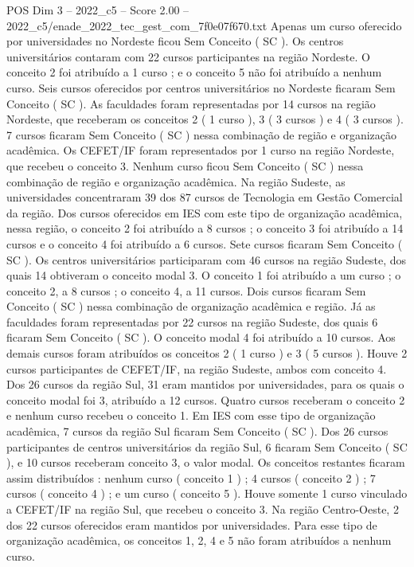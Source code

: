 \begin{textsample}{POS Dim 3 – 2022\_c5 – Score 2.00 – 2022\_c5/enade\_2022\_tec\_gest\_com\_7f0e07f670.txt}
Apenas um curso oferecido por universidades no Nordeste ficou Sem Conceito ( SC ).
Os centros universitários contaram com 22 cursos participantes na região Nordeste.
O conceito 2 foi atribuído a 1 curso ; e o conceito 5 não foi atribuído a nenhum curso.
Seis cursos oferecidos por centros universitários no Nordeste ficaram Sem Conceito ( SC ).
As faculdades foram representadas por 14 cursos na região Nordeste, que receberam os conceitos 2 ( 1 curso ), 3 ( 3 cursos ) e 4 ( 3 cursos ). 7 cursos ficaram Sem Conceito ( SC ) nessa combinação de região e organização acadêmica.
Os CEFET/IF foram representados por 1 curso na região Nordeste, que recebeu o conceito 3.
Nenhum curso ficou Sem Conceito ( SC ) nessa combinação de região e organização acadêmica.
Na região Sudeste, as universidades concentraram 39 dos 87 cursos de Tecnologia em Gestão Comercial da região.
Dos cursos oferecidos em IES com este tipo de organização acadêmica, nessa região, o conceito 2 foi atribuído a 8 cursos ; o conceito 3 foi atribuído a 14 cursos e o conceito 4 foi atribuído a 6 cursos.
Sete cursos ficaram Sem Conceito ( SC ).
Os centros universitários participaram com 46 cursos na região Sudeste, dos quais 14 obtiveram o conceito modal 3.
O conceito 1 foi atribuído a um curso ; o conceito 2, a 8 cursos ; o conceito 4, a 11 cursos.
Dois cursos ficaram Sem Conceito ( SC ) nessa combinação de organização acadêmica e região.
Já as faculdades foram representadas por 22 cursos na região Sudeste, dos quais 6 ficaram Sem Conceito ( SC ).
O conceito modal 4 foi atribuído a 10 cursos.
Aos demais cursos foram atribuídos os conceitos 2 ( 1 curso ) e 3 ( 5 cursos ).
Houve 2 cursos participantes de CEFET/IF, na região Sudeste, ambos com conceito 4.
Dos 26 cursos da região Sul, 31 eram mantidos por universidades, para os quais o conceito modal foi 3, atribuído a 12 cursos.
Quatro cursos receberam o conceito 2 e nenhum curso recebeu o conceito 1.
Em IES com esse tipo de organização acadêmica, 7 cursos da região Sul ficaram Sem Conceito ( SC ).
Dos 26 cursos participantes de centros universitários da região Sul, 6 ficaram Sem Conceito ( SC ), e 10 cursos receberam conceito 3, o valor modal.
Os conceitos restantes ficaram assim distribuídos : nenhum curso ( conceito 1 ) ; 4 cursos ( conceito 2 ) ; 7 cursos ( conceito 4 ) ; e um curso ( conceito 5 ).
Houve somente 1 curso vinculado a CEFET/IF na região Sul, que recebeu o conceito 3.
Na região Centro-Oeste, 2 dos 22 cursos oferecidos eram mantidos por universidades.
Para esse tipo de organização acadêmica, os conceitos 1, 2, 4 e 5 não foram atribuídos a nenhum curso.

\end{textsample}
